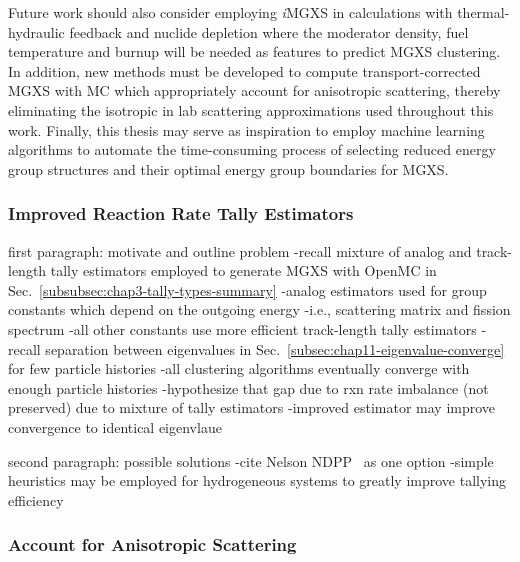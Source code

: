 Future work should also consider employing \textit{i}MGXS in calculations with thermal-hydraulic feedback and nuclide depletion where the moderator density, fuel temperature and burnup will be needed as features to predict MGXS clustering. In addition, new methods must be developed to compute transport-corrected MGXS with MC which appropriately account for anisotropic scattering, thereby eliminating the isotropic in lab scattering approximations used throughout this work. Finally, this thesis may serve as inspiration to employ machine learning algorithms to automate the time-consuming process of selecting reduced energy group structures and their optimal energy group boundaries for MGXS.

\subsubsection{Improved Reaction Rate Tally Estimators}
\label{subsubsec:chap12-tally-estimators}

first paragraph: motivate and outline problem
-recall mixture of analog and track-length tally estimators employed to generate \ac{MGXS} with OpenMC in Sec.~\ref{subsubsec:chap3-tally-types-summary}
  -analog estimators used for group constants which depend on the outgoing energy
    -i.e., scattering matrix and fission spectrum
  -all other constants use more efficient track-length tally estimators
-recall separation between eigenvalues in Sec.~\ref{subsec:chap11-eigenvalue-converge} for few particle histories
  -all clustering algorithms eventually converge with enough particle histories
  -hypothesize that gap due to rxn rate imbalance (not preserved) due to mixture of tally estimators  
  -improved estimator may improve convergence to identical eigenvlaue

second paragraph: possible solutions
-cite Nelson NDPP~\cite{nelson2014improved} as one option
-simple heuristics may be employed for hydrogeneous systems to greatly improve tallying efficiency

\subsubsection{Account for Anisotropic Scattering}
\label{subsubsec:chap12-transport-mgxs}

